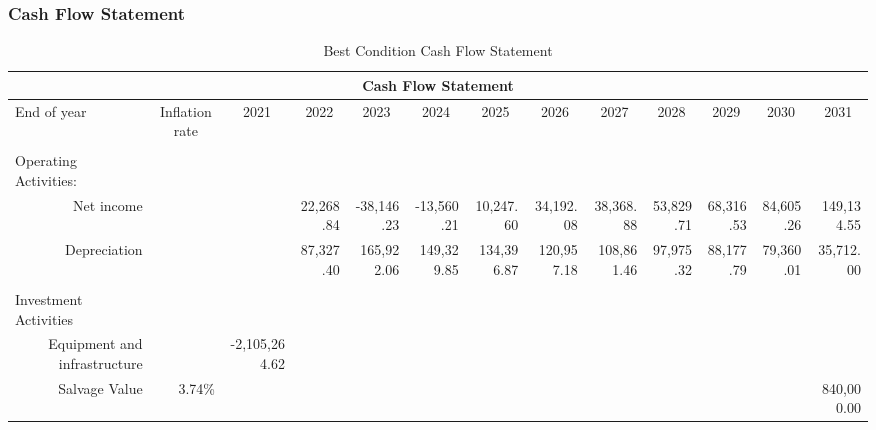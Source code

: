 \documentclass[12pt]{article}
\begin{document}
\begin{landscape}
\subsubsection{Cash Flow Statement}
\tiny
\begin{table}[htbp]
\tiny
  \centering
  \caption{Best Condition Cash Flow Statement}
    \begin{tabular}{|r|r|l|r|r|l|r|r|r|r|r|r|r|}
    \toprule
    \multicolumn{13}{|c|}{\textbf{Cash Flow Statement }} \\
    \hline
    \multicolumn{1}{|l|}{End of year} & \multicolumn{1}{c|}{Inflation rate } & \multicolumn{1}{c|}{2021} & \multicolumn{1}{c|}{2022} & \multicolumn{1}{c|}{2023} & \multicolumn{1}{c|}{2024} & \multicolumn{1}{c|}{2025} & \multicolumn{1}{c|}{2026} & \multicolumn{1}{c|}{2027} & \multicolumn{1}{c|}{2028} & \multicolumn{1}{c|}{2029} & \multicolumn{1}{c|}{2030} & \multicolumn{1}{c|}{2031} \\
    \hline
          &       &       &       &       &       &       &       &       &       &       &       &  \\
    \hline
    \multicolumn{1}{|l|}{Operating Activities:} &       &       &       &       &       &       &       &       &       &       &       &  \\
    \hline
                  Net income &       &       & 22,268.84 & \textcolor[rgb]{ 1,  0,  0}{-38,146.23} & \multicolumn{1}{r|}{\textcolor[rgb]{ 1,  0,  0}{-13,560.21}} & 10,247.60 & 34,192.08 & 38,368.88 & 53,829.71 & 68,316.53 & 84,605.26 & 149,134.55 \\
    \hline
                  Depreciation &       &       & 87,327.40 & 165,922.06 & \multicolumn{1}{r|}{149,329.85} & 134,396.87 & 120,957.18 & 108,861.46 & 97,975.32 & 88,177.79 & 79,360.01 & 35,712.00 \\
    \hline
          &       &       &       &       &       &       &       &       &       &       &       &  \\
    \hline
    \multicolumn{1}{|l|}{Investment Activities        } &       &       &       &       &       &       &       &       &       &       &       &  \\
    \hline
                  Equipment and infrastructure &       & \multicolumn{1}{r|}{\textcolor[rgb]{ 1,  0,  0}{-2,105,264.62}} &       &       &       &       &       &       &       &       &       &  \\
    \hline
                  Salvage Value & 3.74\% &       &       &       &       &       &       &       &       &       &       & 840,000.00 \\

\end{tabular}
\end{table}
\end{landscape}
\end{document}
